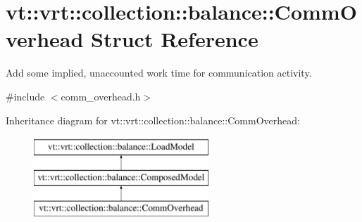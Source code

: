 \hypertarget{structvt_1_1vrt_1_1collection_1_1balance_1_1_comm_overhead}{}\section{vt\+:\+:vrt\+:\+:collection\+:\+:balance\+:\+:Comm\+Overhead Struct Reference}
\label{structvt_1_1vrt_1_1collection_1_1balance_1_1_comm_overhead}


Add some implied, unaccounted work time for communication activity.  




{\ttfamily \#include $<$comm\+\_\+overhead.\+h$>$}

Inheritance diagram for vt\+:\+:vrt\+:\+:collection\+:\+:balance\+:\+:Comm\+Overhead\+:\begin{figure}[H]
\begin{center}
\leavevmode
\includegraphics[height=3.000000cm]{structvt_1_1vrt_1_1collection_1_1balance_1_1_comm_overhead}
\end{center}
\end{figure}
